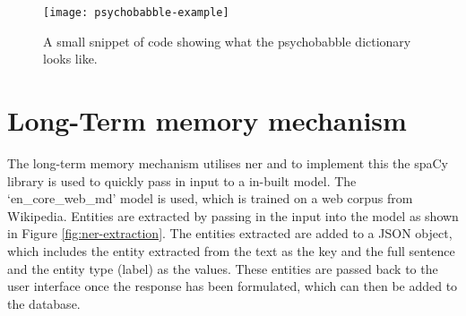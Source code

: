 \begin{figure}[h]
	\centering
	\texttt{[image: psychobabble-example]}
	\caption{A small snippet of code showing what the psychobabble dictionary looks like.}
	\label{fig:psychobabble-example}
\end{figure}
\section{Long-Term memory mechanism}
The long-term memory mechanism utilises \gls{ner} and to implement this the spaCy library is used to quickly pass in input to a in-built model. The `en\_core\_web\_md' model is used, which is trained on a web corpus from Wikipedia. Entities are extracted by passing in the input into the model as shown in Figure \ref{fig:ner-extraction}. The entities extracted are added to a JSON object, which includes the entity extracted from the text as the key and the full sentence and the entity type (label) as the values. These entities are passed back to the user interface once the response has been formulated, which can then be added to the database. \\

